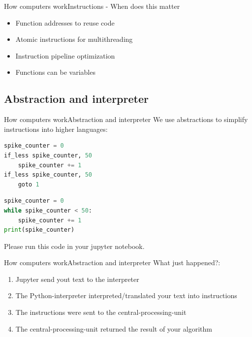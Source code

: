 \documentclass[aspectratio=169]{beamer}
\begin{document}
\begin{frame}{How computers work}{Instructions - When does this matter}
\begin{itemize}
	\item Function addresses to reuse code
	\item Atomic instructions for multithreading
	\item Instruction pipeline optimization
	\item Functions can be variables
\end{itemize}
\end{frame}

\subsection{Abstraction and interpreter}
\begin{frame}[fragile]{How computers work}{Abstraction and interpreter}
We use abstractions to simplify instructions into higher languages:

\begin{lstlisting}[language=Python, frame=single]
spike_counter = 0
if_less spike_counter, 50
	spike_counter += 1
if_less spike_counter, 50
	goto 1
\end{lstlisting}
\pause
\begin{lstlisting}[language=Python, frame=single]
spike_counter = 0
while spike_counter < 50:
	spike_counter += 1
print(spike_counter)
\end{lstlisting}
\pause
Please run this code in your jupyter notebook.
\end{frame}

\begin{frame}{How computers work}{Abstraction and interpreter}
What just happened?:
\begin{enumerate}
	\item Jupyter send yout text to the interpreter
	\item The Python-interpreter interpreted/translated your text into instructions
	\item The instructions were sent to the central-processing-unit
	\item The central-processing-unit returned the result of your algorithm
\end{enumerate}
\end{frame}
\end{document}
